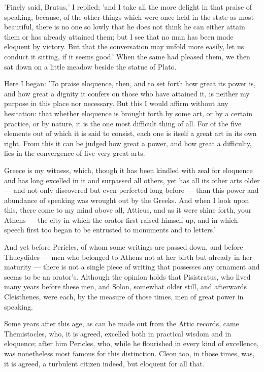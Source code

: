  'Finely said, Brutus,' I replied; 'and I take all the more delight in that praise of speaking, because, of the other things which were once held in the state as most beautiful, there is no one so lowly that he does not think he can either attain them or has already attained them; but I see that no man has been made eloquent by victory. But that the conversation may unfold more easily, let us conduct it sitting, if it seems good.' When the same had pleased them, we then sat down on a little meadow beside the statue of Plato.

 Here I began: 'To praise eloquence, then, and to set forth how great its power is, and how great a dignity it confers on those who have attained it, is neither my purpose in this place nor necessary. But this I would affirm without any hesitation: that whether eloquence is brought forth by some art, or by a certain practice, or by nature, it is the one most difficult thing of all. For of the five elements out of which it is said to consist, each one is itself a great art in its own right. From this it can be judged how great a power, and how great a difficulty, lies in the convergence of five very great arts.

 Greece is my witness, which, though it has been kindled with zeal for eloquence and has long excelled in it and surpassed all others, yet has all its other arts older — and not only discovered but even perfected long before — than this power and abundance of speaking was wrought out by the Greeks. And when I look upon this, there come to my mind above all, Atticus, and as it were shine forth, your Athens — the city in which the orator first raised himself up, and in which speech first too began to be entrusted to monuments and to letters.'

 And yet before Pericles, of whom some writings are passed down, and before Thucydides — men who belonged to Athens not at her birth but already in her maturity — there is not a single piece of writing that possesses any ornament and seems to be an orator's. Although the opinion holds that Pisistratus, who lived many years before these men, and Solon, somewhat older still, and afterwards Cleisthenes, were each, by the measure of those times, men of great power in speaking.

 Some years after this age, as can be made out from the Attic records, came Themistocles, who, it is agreed, excelled both in practical wisdom and in eloquence; after him Pericles, who, while he flourished in every kind of excellence, was nonetheless most famous for this distinction. Cleon too, in those times, was, it is agreed, a turbulent citizen indeed, but eloquent for all that.

